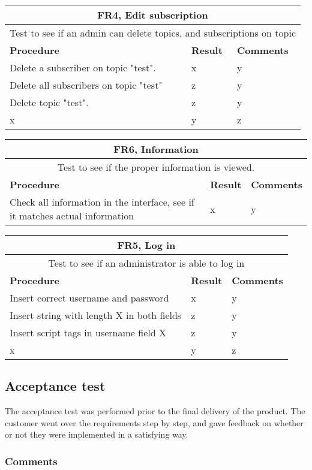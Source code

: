 \begin{table}[ht!]
\begin{tabular}{|m{4cm}|m{2cm}|m{4cm}|}
\hline
\multicolumn{3}{|c|}{\textbf{FR4, Edit subscription}} \\ \hline
\multicolumn{3}{|c|}{{Test to see if an admin can delete topics, and subscriptions on topic}} \\ \hline
\textbf{Procedure} & \textbf{Result} & \textbf{Comments} \\ \hline
Delete a subscriber on topic "test". & x & y \\ \hline
Delete all subscribers on topic "test" &z&y \\ \hline
Delete topic "test". &z&y \\ \hline
x&y&z \\ \hline
\end{tabular}
\end{table}

\begin{table}[ht!]
\begin{tabular}{|m{4cm}|m{2cm}|m{4cm}|}
\hline
\multicolumn{3}{|c|}{\textbf{FR6, Information}} \\ \hline
\multicolumn{3}{|c|}{{Test to see if the proper information is viewed.}} \\ \hline
\textbf{Procedure} & \textbf{Result} & \textbf{Comments} \\ \hline
Check all information in the interface, see if it matches actual information & x & y \\ \hline
\end{tabular}
\end{table}

\begin{table}[ht!]
\begin{tabular}{|m{4cm}|m{2cm}|m{4cm}|}
\hline
\multicolumn{3}{|c|}{\textbf{FR5, Log in}} \\ \hline
\multicolumn{3}{|c|}{{Test to see if an administrator is able to log in}} \\ \hline
\textbf{Procedure} & \textbf{Result} & \textbf{Comments} \\ \hline
Insert correct username and password & x & y \\ \hline
Insert string with length X in both fields &z&y \\ \hline
Insert script tags in username field X &z&y \\ \hline
x&y&z \\ \hline
\end{tabular}
\end{table}

\subsection{Acceptance test}

The acceptance test was performed prior to the final delivery of the product. The customer went over the requirements step by step, and gave feedback on whether or not they were implemented in a satisfying way.

\subsubsection{Comments}


\clearpage